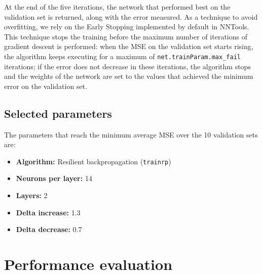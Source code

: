 \documentclass{article}
\begin{document}
At the end of the five iterations, the network that performed best on the validation set is returned, along with the error measured.
As a technique to avoid overfitting, we rely on the Early Stopping implemented by default in NNTools. This technique stops the training before the maximum number of iterations of gradient descent is performed: when the MSE on the validation set starts rising, the algorithm keeps executing for a maximum of \verb$net.trainParam.max_fail$ iterations; if the error does not decrease in these iterations, the algorithm stops and the weights of the network are set to the values that achieved the minimum error on the validation set.

\subsection{Selected parameters}
The parameters that reach the minimum average MSE over the 10 validation sets are:
\begin{itemize}
	\item \textbf{Algorithm:} Resilient backpropagation (\verb$trainrp$)
	\item \textbf{Neurons per layer:} 14
	\item \textbf{Layers:} 2
	\item \textbf{Delta increase:} 1.3
	\item \textbf{Delta decrease:} 0.7 %
\end{itemize}

\section{Performance evaluation}
\end{document}
